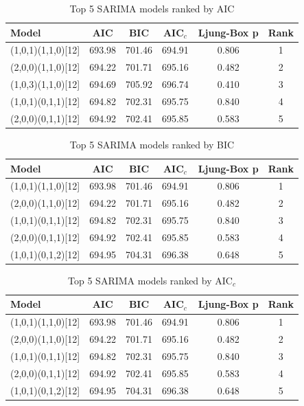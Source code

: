 \documentclass[journal]{IEEEtran}
\begin{document}
\begin{table}[H]
    \centering
    \caption{Top 5 SARIMA models ranked by AIC}
    \label{tab:top_models_aic}
    \begin{tabular}{lccccc}
        \toprule
        Model & AIC & BIC & AIC$_c$ & Ljung-Box p & Rank \\
        \midrule
        (1,0,1)(1,1,0)[12] & 693.98 & 701.46 & 694.91 & 0.806 & 1 \\
        (2,0,0)(1,1,0)[12] & 694.22 & 701.71 & 695.16 & 0.482 & 2 \\
        (1,0,3)(1,1,0)[12] & 694.69 & 705.92 & 696.74 & 0.410 & 3 \\
        (1,0,1)(0,1,1)[12] & 694.82 & 702.31 & 695.75 & 0.840 & 4 \\
        (2,0,0)(0,1,1)[12] & 694.92 & 702.41 & 695.85 & 0.583 & 5 \\
        \bottomrule
    \end{tabular}
\end{table}

\begin{table}[H]
    \centering
    \caption{Top 5 SARIMA models ranked by BIC}
    \label{tab:top_models_bic}
    \begin{tabular}{lccccc}
        \toprule
        Model & AIC & BIC & AIC$_c$ & Ljung-Box p & Rank \\
        \midrule
        (1,0,1)(1,1,0)[12] & 693.98 & 701.46 & 694.91 & 0.806 & 1 \\
        (2,0,0)(1,1,0)[12] & 694.22 & 701.71 & 695.16 & 0.482 & 2 \\
        (1,0,1)(0,1,1)[12] & 694.82 & 702.31 & 695.75 & 0.840 & 3 \\
        (2,0,0)(0,1,1)[12] & 694.92 & 702.41 & 695.85 & 0.583 & 4 \\
        (1,0,1)(0,1,2)[12] & 694.95 & 704.31 & 696.38 & 0.648 & 5 \\
        \bottomrule
    \end{tabular}
\end{table}

\begin{table}[H]
    \centering
    \caption{Top 5 SARIMA models ranked by AIC$_c$}
    \label{tab:top_models_aicc}
    \begin{tabular}{lccccc}
        \toprule
        Model & AIC & BIC & AIC$_c$ & Ljung-Box p & Rank \\
        \midrule
        (1,0,1)(1,1,0)[12] & 693.98 & 701.46 & 694.91 & 0.806 & 1 \\
        (2,0,0)(1,1,0)[12] & 694.22 & 701.71 & 695.16 & 0.482 & 2 \\
        (1,0,1)(0,1,1)[12] & 694.82 & 702.31 & 695.75 & 0.840 & 3 \\
        (2,0,0)(0,1,1)[12] & 694.92 & 702.41 & 695.85 & 0.583 & 4 \\
        (1,0,1)(0,1,2)[12] & 694.95 & 704.31 & 696.38 & 0.648 & 5 \\
        \bottomrule
    \end{tabular}
\end{table}
\end{document}

